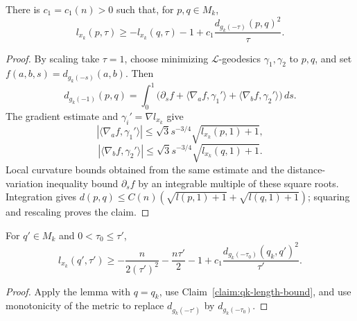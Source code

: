 \begin{lemma}\label{lem:l-function-lower-bound}
\label{lowerbdd}

There is $c_1=c_1(n)>0$ such that, for $p,q\in M_k$,
\[
 l_{x_k}(p,\tau)\geq-l_{x_k}(q,\tau)-1
 +c_1\frac{d_{g_k(-\tau)}(p,q)^2}{\tau}.
\]
\end{lemma}
\begin{proof}
\sketch By scaling take $\tau=1$, choose minimizing
$\mathcal L$-geodesics $\gamma_1,\gamma_2$ to $p,q$, and set
$f(a,b,s)=d_{g_k(-s)}(a,b)$. Then
\begin{equation}\label{fform}
 d_{g_k(-1)}(p,q)=\int_0^1
 \bigl(\partial_sf+\langle\nabla_af,\gamma_1'\rangle
 +\langle\nabla_bf,\gamma_2'\rangle\bigr)\,ds.
\end{equation}
The gradient estimate and $\gamma_i'=\nabla l_{x_k}$ give
\begin{equation}\label{1eqn}
 |\langle\nabla_af,\gamma_1'\rangle|
 \leq\sqrt3s^{-3/4}\sqrt{l_{x_k}(p,1)+1},
\end{equation}
\begin{equation}\label{2eqn}
 |\langle\nabla_bf,\gamma_2'\rangle|
 \leq\sqrt3s^{-3/4}\sqrt{l_{x_k}(q,1)+1}.
\end{equation}
Local curvature bounds obtained from the same estimate and the
distance-variation inequality bound $\partial_sf$ by an integrable
multiple of these square roots. Integration gives
$d(p,q)\leq C(n)(\sqrt{l(p,1)+1}+\sqrt{l(q,1)+1})$; squaring and
rescaling proves the claim.
\end{proof}

\begin{corollary}\label{cor:l-function-lower-bound-refined}

For $q'\in M_k$ and $0<\tau_0\leq\tau'$,
\[
 l_{x_k}(q',\tau')\geq
 -\frac{n}{2(\tau')^2}-\frac{n\tau'}2-1
 +c_1\frac{d_{g_k(-\tau_0)}(q_k,q')^2}{\tau'}.
\]
\end{corollary}
\begin{proof}
\sketch
{}
Apply the lemma with $q=q_k$, use
Claim~\ref{claim:qk-length-bound}, and use monotonicity of the metric
to replace $d_{g_k(-\tau')}$ by $d_{g_k(-\tau_0)}$.
\end{proof}

